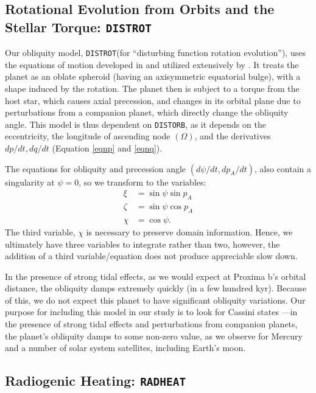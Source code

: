 \documentclass[preprint,12pt]{aastex}
\def\distorb{\texttt{\footnotesize{DISTORB}}\xspace}
\def\distrot{\texttt{\footnotesize{DISTROT}}\xspace}
\def\radheat{\texttt{\footnotesize{RADHEAT}}\xspace}
\begin{document}
\subsection{Rotational Evolution from Orbits and the Stellar Torque: \distrot}
\label{sec:models:distrot}
Our obliquity model, \distrot (for ``disturbing function rotation
evolution''), uses the equations of motion developed in
\cite{Kinoshita1975, Kinoshita1977} and utilized extensively by
\cite{Laskar1986,Laskar1993a,Laskar1993b,Armstrong14}.  It treats the
planet as an oblate spheroid (having an axisymmetric equatorial
bulge), with a shape induced by the rotation. The planet then is
subject to a torque from the host star, which causes axial precession,
and changes in its orbital plane due to perturbations from a companion
planet, which directly change the obliquity angle.  This model is thus
dependent on \distorb, as it depends on the eccentricity, the
longitude of ascending node $(\Omega)$, and the derivatives $dp/dt,
dq/dt$ (Equation \ref{eqnp} and \ref{eqnq}).

The equations for obliquity and precession angle $(d\psi/dt,
dp_A/dt)$, also contain a singularity at $\psi = 0$, so we transform
to the variables:
\begin{align}
\xi & = \sin{\psi} \sin{p_A} \\
\zeta & = \sin{\psi} \cos{p_A} \\
\chi & = \cos{\psi}.
\end{align}
The third variable, $\chi$ is necessary to preserve domain
information. Hence, we ultimately have three variables to integrate
rather than two, however, the addition of a third variable/equation
does not produce appreciable slow down.

In the presence of strong tidal effects, as we would expect at Proxima
b's orbital distance, the obliquity damps extremely quickly (in a few
hundred kyr). Because of this, we do not expect this planet to have
significant obliquity variations. Our purpose for including this model
in our study is to look for Cassini states \citep{Colombo1966}---in
the presence of strong tidal effects and perturbations from companion
planets, the planet's obliquity damps to some non-zero value, as we
observe for Mercury and a number of solar system satellites, including
Earth's moon.

\subsection{Radiogenic Heating: \radheat}
\label{sec:models:radheat}
\end{document}
